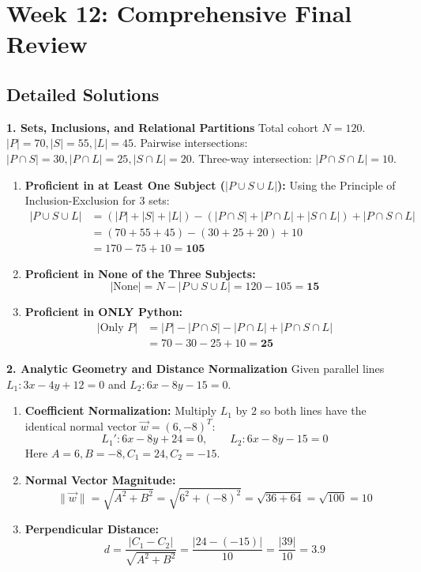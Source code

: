 \section*{Week 12: Comprehensive Final Review}

\subsection*{Detailed Solutions}

\textbf{1. Sets, Inclusions, and Relational Partitions}
Total cohort $N = 120$. $|P| = 70, |S| = 55, |L| = 45$.
Pairwise intersections: $|P \cap S| = 30, |P \cap L| = 25, |S \cap L| = 20$.
Three-way intersection: $|P \cap S \cap L| = 10$.
\begin{enumerate}
    \item \textbf{Proficient in at Least One Subject ($|P \cup S \cup L|$):}
    Using the Principle of Inclusion-Exclusion for 3 sets:
    \begin{align*}
    |P \cup S \cup L| &= (|P| + |S| + |L|) - (|P \cap S| + |P \cap L| + |S \cap L|) + |P \cap S \cap L| \\
    &= (70 + 55 + 45) - (30 + 25 + 20) + 10 \\
    &= 170 - 75 + 10 = \mathbf{105}
    \end{align*}
    \item \textbf{Proficient in None of the Three Subjects:}
    \begin{equation*}
    |\text{None}| = N - |P \cup S \cup L| = 120 - 105 = \mathbf{15}
    \end{equation*}
    \item \textbf{Proficient in ONLY Python:}
    \begin{align*}
    |\text{Only } P| &= |P| - |P \cap S| - |P \cap L| + |P \cap S \cap L| \\
    &= 70 - 30 - 25 + 10 = \mathbf{25}
    \end{align*}
\end{enumerate}

\textbf{2. Analytic Geometry and Distance Normalization}
Given parallel lines $L_1: 3x - 4y + 12 = 0$ and $L_2: 6x - 8y - 15 = 0$.
\begin{enumerate}
    \item \textbf{Coefficient Normalization:} Multiply $L_1$ by $2$ so both lines have the identical normal vector $\vec{w} = (6, -8)^T$:
    \begin{equation*}
    L_1': 6x - 8y + 24 = 0, \qquad L_2: 6x - 8y - 15 = 0
    \end{equation*}
    Here $A = 6, B = -8, C_1 = 24, C_2 = -15$.
    \item \textbf{Normal Vector Magnitude:}
    \begin{equation*}
    \|\vec{w}\| = \sqrt{A^2 + B^2} = \sqrt{6^2 + (-8)^2} = \sqrt{36 + 64} = \sqrt{100} = 10
    \end{equation*}
    \item \textbf{Perpendicular Distance:}
    \begin{equation*}
    d = \frac{|C_1 - C_2|}{\sqrt{A^2 + B^2}} = \frac{|24 - (-15)|}{10} = \frac{|39|}{10} = \mathbf{3.9}
    \end{equation*}
\end{enumerate}

